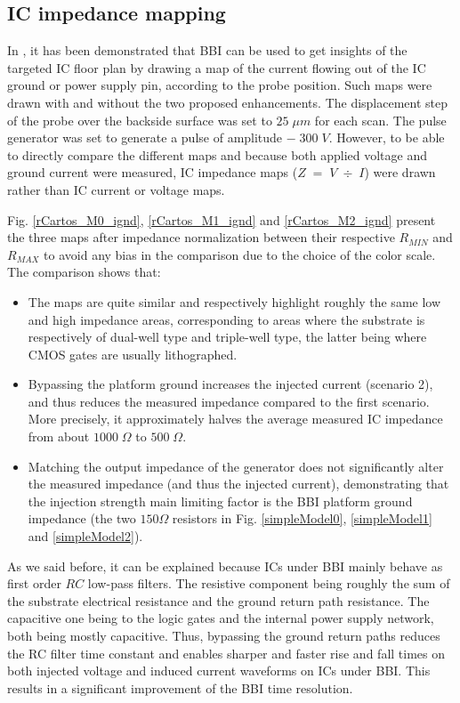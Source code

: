 \documentclass[10pt, conference, compsocconf]{IEEEtran}
\begin{document}
\subsection{IC impedance mapping}
\label{subsection:moreXPGLobalResMap}

In \cite{mybbi2}, it has been demonstrated that BBI can be used to get insights of the targeted IC floor plan by drawing a map of the current flowing out of the IC ground or power supply pin, according to the probe position.
Such maps were drawn with and without the two proposed enhancements.
The displacement step of the probe over the backside surface was set to $25 \; \mu m$ for each scan.
The pulse generator was set to generate a pulse of amplitude $- \;300 \; V$.
However, to be able to directly compare the different maps and because both applied voltage and ground current were measured, IC impedance maps ($Z \; = \; V \; \div \; I$) were drawn rather than IC current or voltage maps.

Fig. \ref{rCartos_M0_ignd}, \ref{rCartos_M1_ignd} and \ref{rCartos_M2_ignd} present the three maps after impedance normalization between their respective $R_{MIN}$ and $R_{MAX}$ to avoid any bias in the comparison due to the choice of the color scale. The comparison shows that:
\begin{itemize}
    \item The maps are quite similar and respectively highlight roughly the same low and high impedance areas, corresponding to areas where the substrate is respectively of dual-well type and triple-well type, the latter being where CMOS gates are usually lithographed.
    \item Bypassing the platform ground increases the injected current (scenario 2), and thus reduces the measured impedance compared to the first scenario.
    More precisely, it approximately halves the average measured IC impedance from about $1000 \; \Omega$ to $500 \; \Omega$.
    \item Matching the output impedance of the generator does not significantly alter the measured impedance (and thus the injected current), demonstrating that the injection strength main limiting factor is the BBI platform ground impedance (the two $150 \Omega$ resistors in Fig. \ref{simpleModel0}, \ref{simpleModel1} and \ref{simpleModel2}).
\end{itemize}
As we said before, it can be explained because ICs under BBI mainly behave as first order $RC$ low-pass filters.
The resistive component being roughly the sum of the substrate electrical resistance and the ground return path resistance.
The capacitive one being to the logic gates and the internal power supply network, both being mostly capacitive.
Thus, bypassing the ground return paths reduces the RC filter time constant and enables sharper and faster rise and fall times on both injected voltage and induced current waveforms on ICs under BBI.
This results in a significant improvement of the BBI time resolution.
\end{document}
